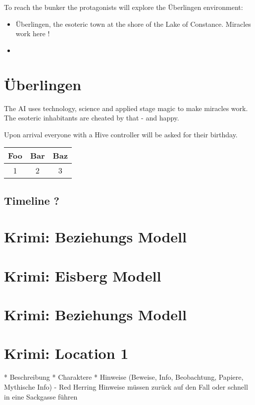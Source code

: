 To reach the bunker the protagonists will explore the Überlingen environment:
\begin{itemize}
    \item {Überlingen, the esoteric town at the shore of the Lake of Constance. Miracles work here !}
    \item {}
\end{itemize}


\section{Überlingen}

The AI uses technology, science and applied stage magic to make miracles work. The esoteric inhabitants are cheated by that - and happy.

Upon arrival everyone with a Hive controller will be asked for their birthday.


\begin{tabularx}{\linewidth}{ccc}
    \hline
    Foo & Bar & Baz \\ [0.5ex]
    \hline
    1 & 2 & 3 \\
\end{tabularx}

\subsection{Timeline ?}

\section{Krimi: Beziehungs Modell}

\section{Krimi: Eisberg Modell}

\section{Krimi: Beziehungs Modell}

\section{Krimi: Location 1}

* Beschreibung
* Charaktere
* Hinweise (Beweise, Info, Beobachtung, Papiere, Mythische Info) - Red Herring Hinweise müssen zurück auf den Fall oder schnell in eine Sackgasse führen


